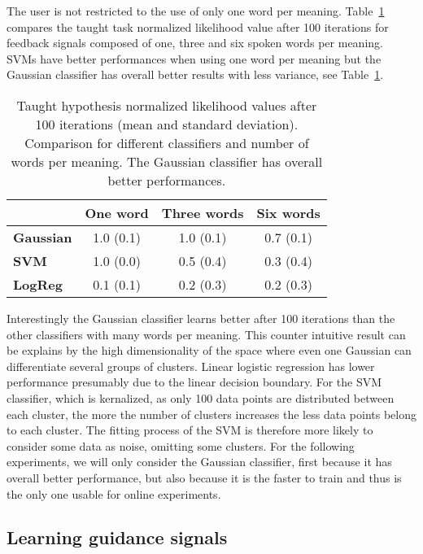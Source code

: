 The user is not restricted to the use of only one word per meaning. Table~\ref{tab:1} compares the taught task normalized likelihood value after 100 iterations for feedback signals composed of one, three and six spoken words per meaning. SVMs have better performances when using one word per meaning but the Gaussian classifier has overall better results with less variance, see Table~\ref{tab:1}.

\begin{table}[!htbp]
\centering
\begin{tabular}{|l|c|c|c|}
\hline
&\textbf{One word}&\textbf{Three words}&\textbf{Six words}\\\hline
\textbf{Gaussian}&1.0 (0.1)&1.0 (0.1)&0.7 (0.1)\\\hline
\textbf{SVM}&1.0 (0.0)&0.5 (0.4)&0.3 (0.4)\\\hline
\textbf{LogReg}&0.1 (0.1)&0.2 (0.3)&0.2 (0.3)\\\hline
\end{tabular}
\caption{Taught hypothesis normalized likelihood values after 100 iterations (mean and standard deviation). Comparison for different classifiers and number of words per meaning. The Gaussian classifier has overall better performances.}
\label{tab:1}
\end{table}

Interestingly the Gaussian classifier learns better after 100 iterations than the other classifiers with many words per meaning. This counter intuitive result can be explains by the high dimensionality of the space where even one Gaussian can differentiate several groups of clusters. Linear logistic regression has lower performance presumably due to the linear decision boundary. For the SVM classifier, which is kernalized, as only 100 data points are distributed between each cluster, the more the number of clusters increases the less data points belong to each cluster. The fitting process of the SVM is therefore more likely to consider some data as noise, omitting some clusters. For the following experiments, we will only consider the Gaussian classifier, first because it has overall better performance, but also because it is the faster to train and thus is the only one usable for online experiments. 


\subsection{Learning guidance signals}

